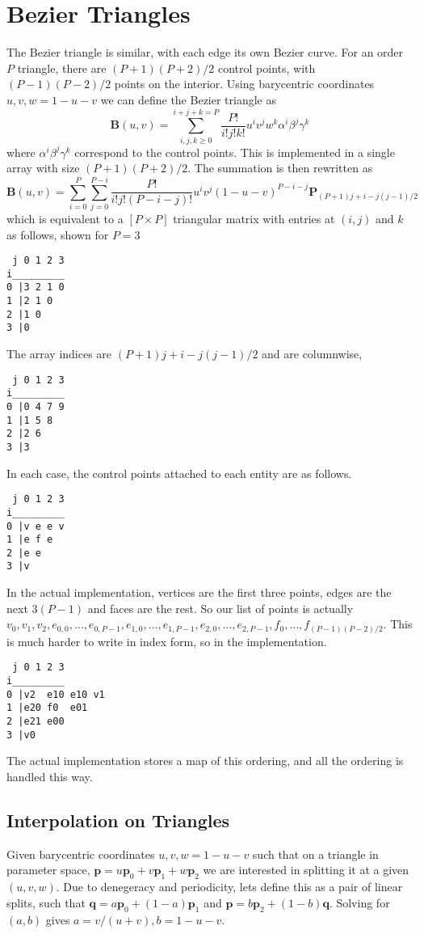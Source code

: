\documentclass{article}
\begin{document}
\section{Bezier Triangles}
The Bezier triangle is similar, with each edge its own Bezier curve. For an order $P$ triangle, there are $(P+1)(P+2)/2$ control points, with $(P-1)(P-2)/2$ points on the interior. Using barycentric coordinates $u,v,w = 1-u-v$ we can define the Bezier triangle as 
\[
\mathbf{B}(u,v) = \displaystyle\sum_{i,j,k\geq 0}^{i+j+k=P} \frac{P!}{i!j!k!}u^iv^jw^k \alpha^i\beta^j\gamma^k 
\]
where $\alpha^i\beta^j\gamma^k$ correspond to the control points. This is implemented in a single array with size $(P+1)(P+2)/2$. The summation is then rewritten as
\[
\mathbf{B}(u,v) = \displaystyle\sum_{i=0}^P \sum_{j=0}^{P-i}\frac{P!}{i!j!(P-i-j)!}u^iv^j(1-u-v)^{P-i-j}\mathbf{P}_{(P+1)j+i-j(j-1)/2}
\]
which is equivalent to a $[P\times P]$ triangular matrix with entries at $(i,j)$ and $k$ as follows, shown for $P = 3$
\begin{verbatim}
 j 0 1 2 3
i_________ 
0 |3 2 1 0
1 |2 1 0   
2 |1 0 
3 |0 
\end{verbatim}
The array indices are $(P+1)j+i-j(j-1)/2$ and are columnwise,
\begin{verbatim}
 j 0 1 2 3
i_________ 
0 |0 4 7 9
1 |1 5 8   
2 |2 6 
3 |3 
\end{verbatim}
In each case, the control points attached to each entity are as follows.
\begin{verbatim}
 j 0 1 2 3
i_________ 
0 |v e e v
1 |e f e   
2 |e e 
3 |v 
\end{verbatim}
In the actual implementation, vertices are the first three points, edges are the next $3(P-1)$ and faces are the rest. So our list of points is actually $v_0,v_1,v_2,e_{0,0},\ldots,e_{0,P-1},e_{1,0},\ldots,e_{1,P-1},e_{2,0},\ldots,e_{2,P-1},f_0,\ldots,f_{(P-1)(P-2)/2}$. This is much harder to write in index form, so in the implementation.
\begin{verbatim}
 j 0 1 2 3
i_________ 
0 |v2  e10 e10 v1
1 |e20 f0  e01   
2 |e21 e00 
3 |v0 
\end{verbatim}
The actual implementation stores a map of this ordering, and all the ordering is handled this way.
\subsection{Interpolation on Triangles}
Given barycentric coordinates $u,v,w=1-u-v$ such that on a triangle in parameter space, $\mathbf{p} = u\mathbf{p}_0 + v\mathbf{p}_1 + w\mathbf{p}_2$ we are interested in splitting it at a given $(u,v,w)$. Due to denegeracy and periodicity, lets define this as a pair of linear splits, such that $ \mathbf{q} = a\mathbf{p}_0 + (1-a)\mathbf{p}_1 $ and $\mathbf{p} = b\mathbf{p}_2 + (1-b)\mathbf{q}$. Solving for $(a,b)$ gives $ a = v/(u+v), b = 1-u-v$.
\end{document}
